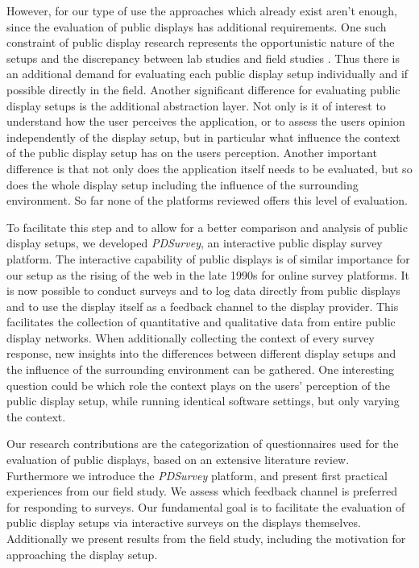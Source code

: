 	However, for our type of use the approaches which already exist aren't enough, since the evaluation of public displays has additional requirements.
	One such constraint of public display research represents the opportunistic nature of the setups and the discrepancy between lab studies and field studies \cite{Ojala2011}. Thus there is an additional demand for evaluating each public display setup individually and if possible directly in the field. Another significant difference for evaluating public display setups is the additional abstraction layer. Not only is it of interest to understand how the user perceives the application, or to assess the users opinion independently of the display setup, but in particular what influence the context of the public display setup has on the users perception. Another important difference is that not only does the application itself needs to be evaluated, but so does the whole display setup including the influence of the surrounding environment. So far none of the platforms reviewed offers this level of evaluation.


	To facilitate this step and to allow for a better comparison and analysis of public display setups, we developed \textit{PDSurvey}, an interactive public display survey platform. The interactive capability of public displays is of similar importance for our setup as the rising of the web in the late 1990s for online survey platforms. It is now possible to conduct surveys and to log data directly from public displays and to use the display itself as a feedback channel to the display provider.
	This facilitates the collection of quantitative and qualitative data from entire public display networks. When additionally collecting the context of every survey response, new insights into the differences between different display setups and the influence of the surrounding environment can be gathered. One interesting question could be which role the context plays on the users' perception of the public display setup, while running identical software settings, but only varying the context.

	Our research contributions are the categorization of questionnaires used for the evaluation of public displays, based on an extensive literature review. Furthermore we introduce the \textit{PDSurvey} platform, and present first practical experiences from our field study. We assess which feedback channel is preferred for responding to surveys. Our fundamental goal is to facilitate the evaluation of public display setups via interactive surveys on the displays themselves. Additionally we present results from the field study, including the motivation for approaching the display setup.

